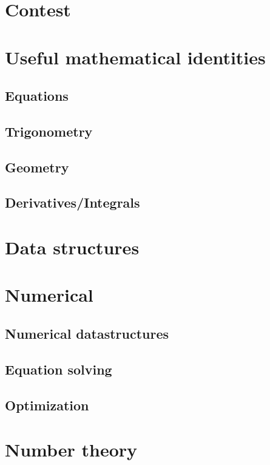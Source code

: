 \documentclass[10pt, a4paper, notitlepage]{report}
\date{2008-12-01}			%
\begin{document}
	\maketitle
	\begin{multicols*}{3}
	\tableofcontents
	\thispagestyle{fancy}
	
	\chapter{Contest}
	
	\chapter{Useful mathematical identities}
	\section{Equations}
	\section{Trigonometry}
	\section{Geometry}
	\section{Derivatives/Integrals}
	
	\chapter{Data structures}
	
	\chapter{Numerical}
	\section{Numerical datastructures}
	\section{Equation solving}
	\section{Optimization}
	
	\chapter{Number theory}

\end{multicols*}
\end{document}
